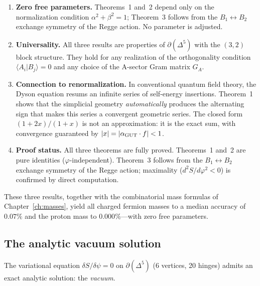 \begin{enumerate}
\item \textbf{Zero free parameters.}
Theorems~1 and~2 depend only on the normalization condition
$\alpha^2 + \beta^2 = 1$; Theorem~3 follows from the $B_1 \leftrightarrow B_2$
exchange symmetry of the Regge action.  No parameter is adjusted.

\item \textbf{Universality.}
All three results are properties of $\partial(\Delta^5)$ with the
$(3,2)$ block structure.  They hold for any realization of the
orthogonality condition $\langle A_i | B_j \rangle = 0$ and any
choice of the A-sector Gram matrix $G_A$.

\item \textbf{Connection to renormalization.}
In conventional quantum field theory, the Dyson equation resums an
infinite series of self-energy insertions.  Theorem~1 shows that the
simplicial geometry \emph{automatically} produces the alternating sign
that makes this series a convergent geometric series.  The closed form
$(1+2x)/(1+x)$ is not an approximation: it is the exact sum, with
convergence guaranteed by $|x| = |\alpha_{\mathrm{GUT}} \cdot f| < 1$.

\item \textbf{Proof status.}
All three theorems are fully proved.  Theorems~1 and~2 are pure identities ($\varphi$-independent).  Theorem~3 follows from the $B_1 \leftrightarrow B_2$ exchange symmetry of the Regge action; maximality ($d^2S/d\varphi^2 < 0$) is confirmed by direct computation.
\end{enumerate}

These three results, together with the combinatorial mass formulas of
Chapter~\ref{ch:masses}, yield all charged fermion masses to a median
accuracy of $0.07\%$ and the proton mass to $0.000\%$---with zero
free parameters.

\subsection{The analytic vacuum solution}
\label{sec:vacuum_solution}

The variational equation $\delta S/\delta\psi = 0$ on $\partial(\Delta^5)$ (6 vertices, 20 hinges) admits an exact analytic solution: the \emph{vacuum}.

